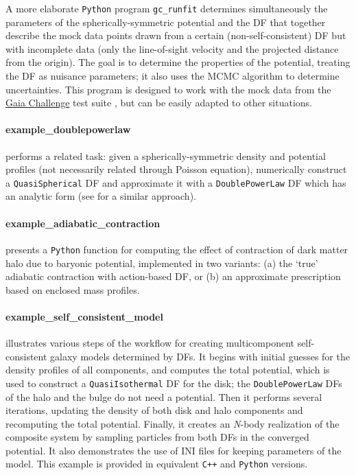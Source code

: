 \documentclass[12pt]{article}
\newcommand{\Nbody}{\textsl{N}-body\xspace}
\newcommand{\Cpp}  {\texttt{C++}\xspace}
\newcommand{\Python}{\texttt{Python}\xspace}
\newcommand{\ppp}[1]{\textcolor{darkolive} {\texttt{#1}}}
\begin{document}
A more elaborate \Python program \texttt{gc_runfit} determines simultaneously the parameters of the spherically-symmetric potential and the DF that together describe the mock data points drawn from a certain (non-self-consistent) DF but with incomplete data (only the line-of-sight velocity and the projected distance from the origin). The goal is to determine the properties of the potential, treating the DF as nuisance parameters; it also uses the MCMC algorithm to determine uncertainties. 
This program is designed to work with the mock data from the \href{http://astrowiki.ph.surrey.ac.uk/dokuwiki/doku.php?id=tests:sphtri:spherical}{Gaia Challenge} test suite \cite{Read2021}, but can be easily adapted to other situations.

\paragraph{example_doublepowerlaw} performs a related task: given a spherically-symmetric density and potential profiles (not necessarily related through Poisson equation), numerically construct a \ppp{QuasiSpherical} DF and approximate it with a \ppp{DoublePowerLaw} DF which has an analytic form (see \cite{Jeffreson2017} for a similar approach).

\paragraph{example_adiabatic_contraction} presents a \Python function for computing the effect of contraction of dark matter halo due to baryonic potential, implemented in two variants: (a) the `true' adiabatic contraction with action-based DF, or (b) an approximate prescription based on enclosed mass profiles.

\paragraph{example_self_consistent_model} \label{sec:ExampleSCM} illustrates various steps of the workflow for creating multicomponent self-consistent galaxy models determined by DFs. It begins with initial guesses for the density profiles of all components, and computes the total potential, which is used to construct a \ppp{QuasiIsothermal} DF for the disk; the \ppp{DoublePowerLaw} DFs of the halo and the bulge do not need a potential. Then it performs several iterations, updating the density of both disk and halo components and recomputing the total potential. Finally, it creates an \Nbody realization of the composite system by sampling particles from both DFs in the converged potential. It also demonstrates the use of INI files for keeping parameters of the model. This example is provided in equivalent \Cpp and \Python versions.
\end{document}
